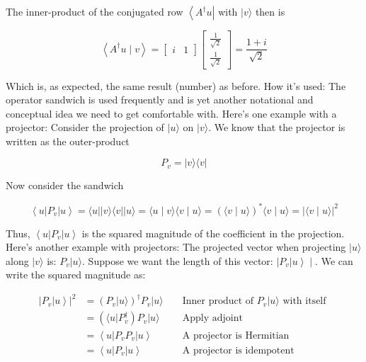 \documentclass[main.tex]{subfiles}
\begin{document}
    The inner-product of the conjugated row $\left\langle A^{\dagger} u\right|$ with $|v\rangle$ then is
    
    $$
    \left\langle A^{\dagger} u \mid v\right\rangle=\left[\begin{array}{ll}
    i & 1
    \end{array}\right]\left[\begin{array}{c}
    \frac{1}{\sqrt{2}} \\
    \frac{1}{\sqrt{2}}
    \end{array}\right]=\frac{1+i}{\sqrt{2}}
    $$
    
    Which is, as expected, the same result (number) as before. How it's used: The operator sandwich is used frequently and is yet another notational and conceptual idea we need to get comfortable with. Here's one example with a projector: Consider the projection of $|u\rangle$ on $|v\rangle$. We know that the projector is written as the outer-product
    
    $$
    P_{v}=|v\rangle\langle v|
    $$
    
    Now consider the sandwich
    
    $$
    \left\langle u\left|P_{v}\right| u\right\rangle=\langle u|| v\rangle\langle v|| u\rangle=\langle u \mid v\rangle\langle v \mid u\rangle=(\langle v \mid u\rangle)^{*}\langle v \mid u\rangle=|\langle v \mid u\rangle|^{2}
    $$
    
    Thus, $\left\langle u\left|P_{v}\right| u\right\rangle$ is the squared magnitude of the coefficient in the projection. Here's another example with projectors: The projected vector when projecting $|u\rangle$ along $|v\rangle$ is: $P_{v}|u\rangle$. Suppose we want the length of this vector: $\left.\left|P_{v}\right| u\right\rangle \mid$. We can write the squared magnitude as: 
    
    $$
    \begin{aligned}
    \left.\left|P_{v}\right| u\right\rangle\left.\right|^{2} &=\left(P_{v}|u\rangle\right)^{\dagger} P_{v}|u\rangle & & \text { Inner product of } P_{v}|u\rangle \text { with itself } \\
    &=\left(\langle u| P_{v}^{\dagger}\right) P_{v}|u\rangle & & \text { Apply adjoint } \\
    &=\left\langle u\left|P_{v} P_{v}\right| u\right\rangle & & \text { A projector is Hermitian } \\
    &=\left\langle u\left|P_{v}\right| u\right\rangle & & \text { A projector is idempotent }
    \end{aligned}
    $$
    
\end{document}
